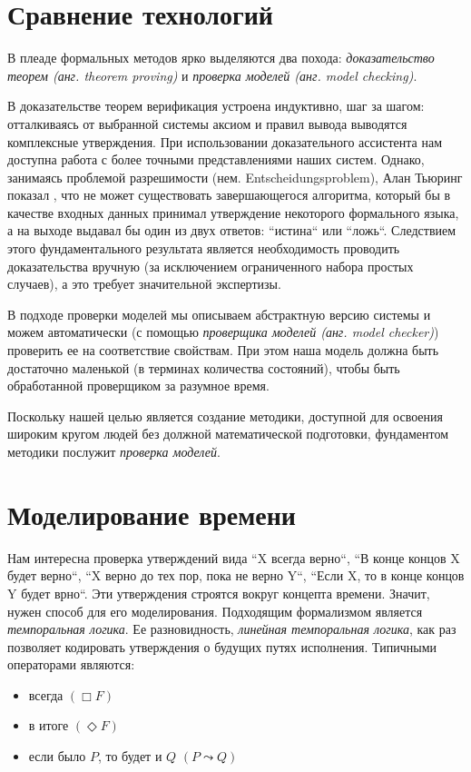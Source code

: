 \documentclass[14pt, openany]{book}
\begin{document}
\section{Сравнение технологий}
В плеаде формальных методов ярко выделяются два похода: \emph{доказательство теорем (анг. theorem proving)} и \emph{проверка моделей (анг. model checking)}. 

В доказательстве теорем верификация устроена индуктивно, шаг за шагом: отталкиваясь от выбранной системы аксиом и правил вывода выводятся комплексные утверждения. При использовании доказательного ассистента нам доступна работа с более точными представлениями наших систем. Однако, занимаясь проблемой разрешимости (нем. Entscheidungsproblem), Алан Тьюринг показал \cite{turing}, что не может существовать завершающегося алгоритма, который бы в качестве входных данных принимал утверждение некоторого формального языка, а на выходе выдавал бы один из двух ответов: ``истина`` или ``ложь``. Следствием этого фундаментального результата является необходимость проводить доказательства вручную (за исключением ограниченного набора простых случаев), а это требует значительной экспертизы.

В подходе проверки моделей мы описываем абстрактную версию системы и можем автоматически (с помощью \emph{проверщика моделей (анг. model checker)}) проверить ее на соответствие свойствам. При этом наша модель должна быть достаточно маленькой (в терминах количества состояний), чтобы быть обработанной проверщиком за разумное время.

Поскольку нашей целью является создание методики, доступной для освоения широким кругом людей без должной математической подготовки, фундаментом методики послужит \emph{проверка моделей}.

\section{Моделирование времени}
Нам интересна проверка утверждений вида ``X всегда верно``, ``В конце концов X будет верно``, ``X верно до тех пор, пока не верно Y``, ``Если X, то в конце концов Y будет врно``. Эти утверждения строятся вокруг концепта времени. Значит, нужен способ для его моделирования. Подходящим формализмом является \emph{темпоральная логика}. Ее разновидность, \emph{линейная темпоральная логика}, как раз позволяет кодировать утверждения о будущих путях исполнения. Типичными операторами являются: 


\begin{itemize}
  \item всегда \((\Box F)\)
  \item в итоге \((\Diamond F)\)
  \item если было \(P\), то будет и \(Q\) \((P \leadsto Q)\)
\end{itemize}
\end{document}
